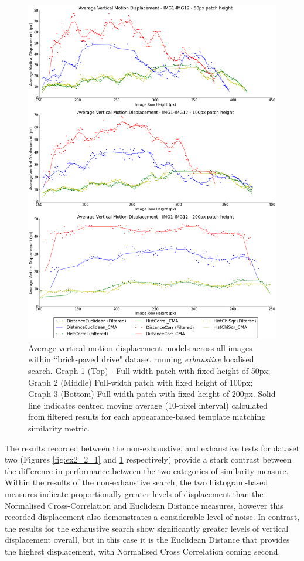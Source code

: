 \clearpage
\begin{figure}[ht!]
\centering
\includegraphics[scale=0.3]{images/results/wiltshire_outside_10cm_non_scaled_exhaustive}
\caption{Average vertical motion displacement models across all images within ``brick-paved drive" dataset running \textit{exhaustive} localised search. Graph 1 (Top) - Full-width patch with fixed height of 50px; Graph 2 (Middle) Full-width patch with fixed height of 100px; Graph 3 (Bottom) Full-width patch with fixed height of 200px. Solid line indicates centred moving average (10-pixel interval) calculated from filtered results for each appearance-based template matching similarity metric.}
\label{fig:ex2_2_2}
\end{figure}

The results recorded between the non-exhaustive, and exhaustive tests for dataset two (Figures \ref{fig:ex2_2_1} and \ref{fig:ex2_2_2} respectively) provide a stark contrast between the difference in performance between the two categories of similarity measure. Within the results of the non-exhaustive search, the two histogram-based measures indicate proportionally greater levels of displacement than the Normalised Cross-Correlation and Euclidean Distance measures, however this recorded displacement also demonstrates a considerable level of noise. In contrast, the results for the exhaustive search show significantly greater levels of vertical displacement overall, but in this case it is the Euclidean Distance that provides the highest displacement, with Normalised Cross Correlation coming second.  

